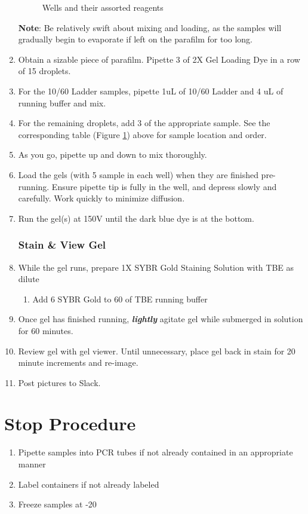 \documentclass{ssiBio}
\begin{document}
\begin{enumerate}
\begin{figure}[ht]
\begin{center}
\begin{tabular}{|l|l|}
\end{tabular}
\label{tab:Gel Layout} %
\caption{Wells and their assorted reagents} %
\end{center}
\end{figure}
\textbf{Note}: Be relatively swift about mixing and loading, as the samples will gradually begin to evaporate if left on the parafilm for too long.
\item{Obtain a sizable piece of parafilm. Pipette 3 \uL{} of 2X Gel Loading Dye in a row of 15 droplets.}
\item{For the 10/60 Ladder samples, pipette 1uL of 10/60 Ladder and 4 uL of running buffer and mix.}
\item{For the remaining droplets, add 3 \uL{} of the appropriate sample. See the corresponding table (Figure \ref{tab:Gel Layout}) above for sample location and order.}
\item{As you go, pipette up and down to mix thoroughly.}
\item{Load the gels (with 5 \uL{} sample in each well) when they are finished pre-running. Ensure pipette tip is fully in the well, and depress slowly and carefully. Work quickly to minimize diffusion.}
\item{Run the gel(s) at 150V until the dark blue dye is at the bottom.}

\subsubsection{Stain \& View Gel}
\item{While the gel runs, prepare 1X SYBR Gold Staining Solution with TBE as dilute}
	\begin{enumerate}
		\item{Add 6\uL{} SYBR Gold to 60\uL{} of TBE running buffer}
	\end{enumerate}
\item{Once gel has finished running, \textbf{\textit{lightly}} agitate gel while submerged in solution for 60 minutes.}
\item{Review gel with gel viewer. Until unnecessary, place gel back in stain for 20 minute increments and re-image.}
\item{Post pictures to Slack.}\\
\end{enumerate} 

\section*{Stop Procedure}
\begin{enumerate}
\item{Pipette samples into PCR tubes if not already contained in an appropriate manner}
\item{Label containers if not already labeled}
\item{Freeze samples at -20\C{}}
\end{enumerate}



\end{document}
